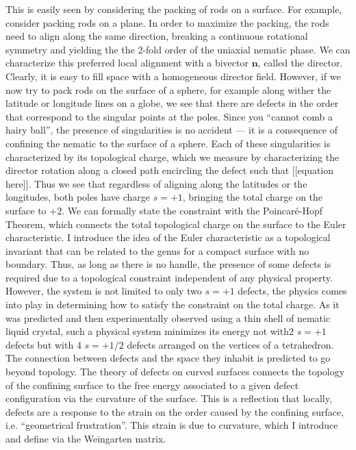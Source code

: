 This is easily seen by considering the packing of rods on a surface.
For example, consider packing rods on a plane.
In order to maximize the packing, the rods need to align along the same direction, breaking a continuous rotational symmetry and yielding the the 2-fold order of the uniaxial nematic phase.
We can characterize this preferred local alignment with a bivector $\mathbf{n}$, called the director.
Clearly, it is easy to fill space with a homogeneous director field.
However, if we now try to pack rods on the surface of a sphere, for example along wither the latitude or longitude lines on a globe, we see that there are defects in the order that correspond to the singular points at the poles.
Since you ``cannot comb a hairy ball'', the presence of singularities is no accident --- it is a consequence of confining the nematic to the surface of a sphere.
Each of these singularities is characterized by its topological charge, which we measure by characterizing the director rotation along a closed path encircling the defect such that [[equation here]].
Thus we see that regardless of aligning along the latitudes or the longitudes, both poles have charge $s = +1$, bringing the total charge on the surface to $+2$.
We can formally state the constraint with the Poincar\'e-Hopf Theorem, which connects the total topological charge on the surface to the Euler characteristic.
I introduce the idea of the Euler characteristic as a topological invariant that can be related to the genus for a compact surface with no boundary.
Thus, as long as there is no handle, the presence of some defects is required due to a topological constraint independent of any physical property.
However, the system is not limited to only two $s=+1$ defects, the physics comes into play in determining how to satisfy the constraint on the total charge.
As it was predicted and then experimentally observed using a thin shell of nematic liquid crystal, such a physical system minimizes its energy not with$2$ $s=+1$ defects but with $4$ $s=+1/2$ defects arranged on the vertices of a tetrahedron.
The connection between defects and the space they inhabit is predicted to go beyond topology.
The theory of defects on curved surfaces connects the topology of the confining surface to the free energy associated to a given defect configuration via the curvature of the surface.
This is a reflection that locally, defects are a response to the strain on the order caused by the confining surface, i.e. ``geometrical frustration''.
This strain is due to curvature, which I introduce and define via the Weingarten matrix.
